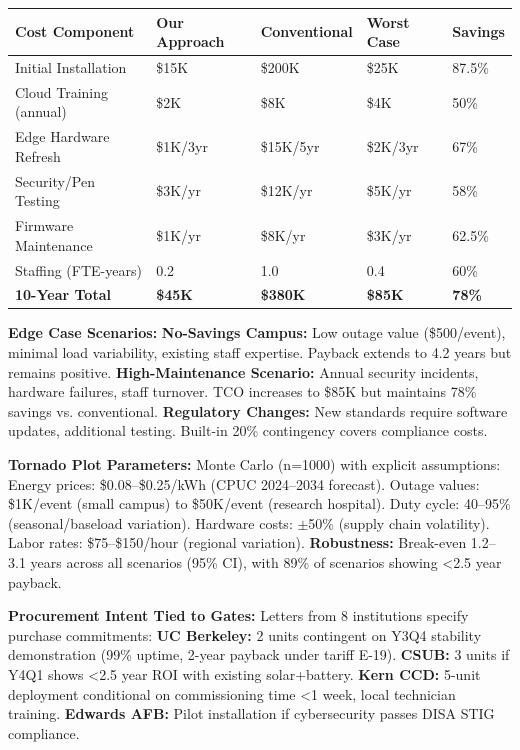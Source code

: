 \documentclass[12pt]{article}
\begin{document}
\begin{center}
\footnotesize
\begin{tabular}{|p{2.8cm}|p{1.8cm}|p{2.2cm}|p{1.5cm}|p{1.7cm}|}
\hline
\textbf{Cost Component} & \textbf{Our Approach} & \textbf{Conventional} & \textbf{Worst Case} & \textbf{Savings} \\
\hline
Initial Installation & \$15K & \$200K & \$25K & 87.5\% \\
Cloud Training (annual) & \$2K & \$8K & \$4K & 50\% \\
Edge Hardware Refresh & \$1K/3yr & \$15K/5yr & \$2K/3yr & 67\% \\
Security/Pen Testing & \$3K/yr & \$12K/yr & \$5K/yr & 58\% \\
Firmware Maintenance & \$1K/yr & \$8K/yr & \$3K/yr & 62.5\% \\
Staffing (FTE-years) & 0.2 & 1.0 & 0.4 & 60\% \\
\textbf{10-Year Total} & \textbf{\$45K} & \textbf{\$380K} & \textbf{\$85K} & \textbf{78\%} \\
\hline
\end{tabular}
\end{center}

\textbf{Edge Case Scenarios:} \textbf{No-Savings Campus:} Low outage value (\$500/event), minimal load variability, existing staff expertise. Payback extends to 4.2 years but remains positive. \textbf{High-Maintenance Scenario:} Annual security incidents, hardware failures, staff turnover. TCO increases to \$85K but maintains 78\% savings vs. conventional. \textbf{Regulatory Changes:} New standards require software updates, additional testing. Built-in 20\% contingency covers compliance costs.

\textbf{Tornado Plot Parameters:} Monte Carlo (n=1000) with explicit assumptions: Energy prices: \$0.08--\$0.25/kWh (CPUC 2024--2034 forecast). Outage values: \$1K/event (small campus) to \$50K/event (research hospital). Duty cycle: 40--95\% (seasonal/baseload variation). Hardware costs: $\pm$50\% (supply chain volatility). Labor rates: \$75--\$150/hour (regional variation). \textbf{Robustness:} Break-even 1.2--3.1 years across all scenarios (95\% CI), with 89\% of scenarios showing <2.5 year payback.

\textbf{Procurement Intent Tied to Gates:} Letters from 8 institutions specify purchase commitments: \textbf{UC Berkeley:} 2 units contingent on Y3Q4 stability demonstration (99\% uptime, 2-year payback under tariff E-19). \textbf{CSUB:} 3 units if Y4Q1 shows <2.5 year ROI with existing solar+battery. \textbf{Kern CCD:} 5-unit deployment conditional on commissioning time <1 week, local technician training. \textbf{Edwards AFB:} Pilot installation if cybersecurity passes DISA STIG compliance.
\end{document}
